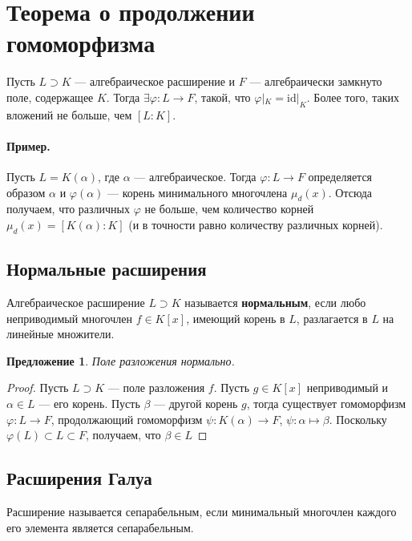 \documentclass[a4paper]{article}
\let\temp\phi
\let\phi\varphi
\let\varphi\temp
\newcommand{\id}{\mathrm{id}}
\numberwithin{theorem}{section}
\numberwithin{lemma}{section}
\newtheorem{proposition}{Предложение}
\numberwithin{proposition}{section}
\numberwithin{corollary}{section}
\begin{document}
\section{Теорема о продолжении гомоморфизма}
Пусть $L \supset K$ --- алгебраическое расширение и $F$ --- алгебраически замкнуто поле, содержащее $K$.
Тогда $\exists \phi: L \to F$, такой, что $\phi|_K = \id|_K$.
Более того, таких вложений не больше, чем $[L : K]$.

\paragraph*{Пример.} Пусть $L = K(\alpha)$,
где $\alpha$ --- алгебраическое.
Тогда $\phi: L \to F$ определяется образом $\alpha$
и $\phi(\alpha)$ --- корень минимального многочлена $\mu_d(x)$.
Отсюда получаем, что различных $\phi$ не больше, чем количество
корней $\mu_d(x) = [K(\alpha) : K]$ (и в точности равно количеству различных корней).


\subsection*{Нормальные расширения}

Алгебраическое расширение $L \supset K$ называется \textbf{нормальным},
если любо неприводимый многочлен $f \in K[x]$, имеющий корень в $L$,
разлагается в $L$ на линейные множители.

\begin{proposition}
Поле разложения нормально.
\end{proposition}
\begin{proof}
Пусть $L \supset K$ --- поле разложения $f$.
Пусть $g \in K[x]$ неприводимый и $\alpha \in L$ --- его корень.
Пусть $\beta$ --- другой корень $g$, тогда существует
гомоморфизм $\phi: L \to F$, продолжающий
гомоморфизм $\psi: K(\alpha) \to F$, $\psi: \alpha \mapsto \beta$.
Поскольку $\phi(L) \subset L \subset F$, получаем, что $\beta \in L$
\end{proof}

\subsection*{Расширения Галуа}

Расширение называется сепарабельным,
если минимальный многочлен каждого его элемента является сепарабельным.
\end{document}
